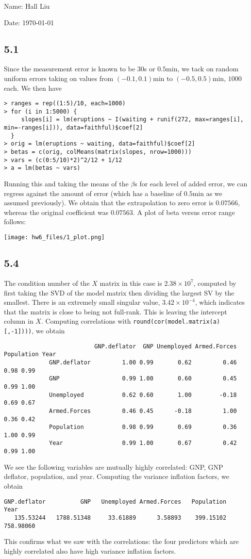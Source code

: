 \documentclass{article}
\begin{document}
Name: Hall Liu

Date: \today 
\vspace{1.5cm}

\subsection*{5.1}
Since the measurement error is known to be $30$s or $0.5$min, we tack on random uniform errors taking on values from $(-0.1,0.1)$min to $(-0.5,0.5)$min, $1000$ each. We then have
\begin{verbatim}
> ranges = rep((1:5)/10, each=1000)
> for (i in 1:5000) {
     slopes[i] = lm(eruptions ~ I(waiting + runif(272, max=ranges[i], min=-ranges[i])), data=faithful)$coef[2]
  }
> orig = lm(eruptions ~ waiting, data=faithful)$coef[2]
> betas = c(orig, colMeans(matrix(slopes, nrow=1000)))
> vars = (c(0:5/10)*2)^2/12 + 1/12
> a = lm(betas ~ vars)
\end{verbatim}
Running this and taking the means of the $\beta$s for each level of added error, we can regress against the amount of error (which has a baseline of $0.5$min as we assumed previously). We obtain that the extrapolation to zero error is $0.07566$, whereas the original coefficient was $0.07563$. A plot of beta versus error range follows: 

\texttt{[image: hw6\_files/1\_plot.png]}
\subsection*{5.4}
The condition number of the $X$ matrix in this case is $2.38\times10^7$, computed by first taking the SVD of the model matrix then dividing the largest SV by the smallest. There is an extremely small singular value, $3.42\times10^{-4}$, which indicates that the matrix is close to being not full-rank. This is leaving the intercept column in $X$.
Computing correlations with \verb|round(cor(model.matrix(a)[,-1])))|, we obtain
\begin{verbatim}
                          GNP.deflator  GNP Unemployed Armed.Forces Population Year
             GNP.deflator         1.00 0.99       0.62         0.46       0.98 0.99
             GNP                  0.99 1.00       0.60         0.45       0.99 1.00
             Unemployed           0.62 0.60       1.00        -0.18       0.69 0.67
             Armed.Forces         0.46 0.45      -0.18         1.00       0.36 0.42
             Population           0.98 0.99       0.69         0.36       1.00 0.99
             Year                 0.99 1.00       0.67         0.42       0.99 1.00
\end{verbatim}             
We see the following variables are mutually highly correlated: GNP, GNP deflator, population, and year.
Computing the variance inflation factors, we obtain
\begin{verbatim}
GNP.deflator          GNP   Unemployed Armed.Forces   Population         Year 
   135.53244   1788.51348     33.61889      3.58893    399.15102    758.98060 
\end{verbatim}
This confirms what we saw with the correlations: the four predictors which are highly correlated also have high variance inflation factors.
\end{document}
